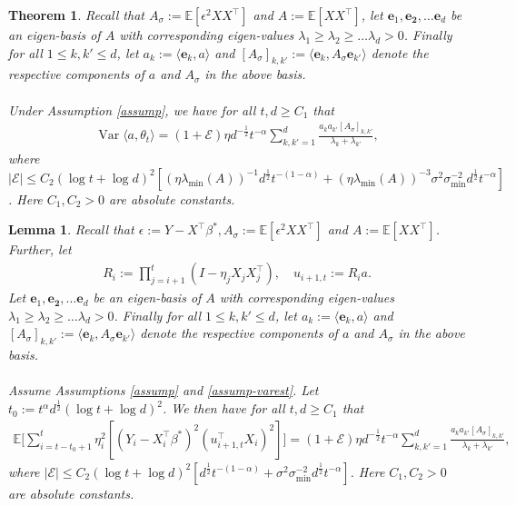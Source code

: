 \documentclass[11pt, reqno,english]{amsart}
\DeclareMathOperator{\Var}{Var} \DeclareMathOperator{\N}{N}
\newtheorem{theorem}{Theorem}[section]
\newtheorem{lemma}{Lemma}[section]
\begin{document}
\begin{theorem}\label{lem:VarAsymp}
Recall that $A_{\sigma} := \mathbb{E}[\epsilon^2 XX^\top]$ and $A := \mathbb{E}[XX^\top]$, let $\mathbf{e}_1, \mathbf{e_2}, \dots \mathbf{e}_d$ be an eigen-basis of $A$ with corresponding eigen-values $\lambda_1 \geq \lambda_2 \geq \dots \lambda_d > 0$. Finally for all $1 \leq k, k' \leq d$, let $a_k := \langle \mathbf{e}_k, a \rangle$ and $[A_{\sigma}]_{k,k'} := \langle  \mathbf{e}_k, A_\sigma \mathbf{e}_{k'}\rangle$ denote the respective components of $a$ and $A_{\sigma}$ in the above basis.
\\\\
Under Assumption \ref{assump}, we have for all $t, d \geq C_1$ that
\begin{align*}
\Var \langle a, \theta_t \rangle = (1 + \mathcal E)\eta d^{-\frac{1}{2}}t^{-\alpha} \sum_{k,k'=1}^d \frac{a_{k}a_{k'}[A_{\sigma}]_{k,k'}}{\lambda_k + \lambda_{k'}},
\end{align*}
where $|\mathcal E| \leq C_2(\log t + \log d)^2 [(\eta \lambda_{\min}(A))^{-1}d^{\frac{1}{2}}t^{-(1-\alpha)} + (\eta \lambda_{\min}(A))^{-3}\sigma^2\sigma_{\min}^{-2}d^{\frac{1}{2}}t^{-\alpha}]$. Here $C_1, C_2 > 0$ are absolute constants.
\end{theorem}
\begin{lemma}\label{variance-sigma-term-2}
Recall that $\epsilon := Y - X^\top \beta^*, A_{\sigma} := \mathbb{E}[\epsilon^2 XX^\top]$ and $A := \mathbb{E}[XX^\top]$. 
Further, let
\begin{align*}
R_i:= \prod_{j = i+1}^{t}(I - \eta_{j}X_{j}X^\top_{j}),  \quad u_{i+1,t} := R_ia.
\end{align*}
Let $\mathbf{e}_1, \mathbf{e_2}, \dots \mathbf{e}_d$ be an eigen-basis of $A$ with corresponding eigen-values $\lambda_1 \geq \lambda_2 \geq \dots \lambda_d > 0$. Finally for all $1 \leq k, k' \leq d$, let $a_k := \langle \mathbf{e}_k, a \rangle$ and $[A_{\sigma}]_{k,k'} := \langle  \mathbf{e}_k, A_\sigma \mathbf{e}_{k'}\rangle$ denote the respective components of $a$ and $A_{\sigma}$ in the above basis.
\\\\
Assume Assumptions \ref{assump} and \ref{assump-varest}. Let $t_0:= t^{\alpha}d^{\frac{1}{2}}(\log t + \log d)^2$. We then have for all $t,d \geq C_1$ that
\begin{align*}
\mathbb{E}\bigg[\sum_{i = t-t_0 + 1}^t \eta_i^2 [(Y_i - X^\top_i \beta^*)^2(u^\top_{i+1,t} X_i)^2] \bigg] = (1+\mathcal E)\eta d^{-\frac{1}{2}}t^{-\alpha}\sum_{k,k' = 1}^d \frac{a_k a_{k'}[A_{\sigma}]_{k,k'}}{\lambda_{k} + \lambda_{k'}},
\end{align*}
where $|\mathcal E| \leq C_2(\log t + \log d)^2 [d^{\frac{1}{2}}t^{-(1-\alpha)} + \sigma^2\sigma^{-2}_{\min}d^{\frac{1}{2}}t^{-\alpha}]$. Here $C_1, C_2 > 0$ are absolute constants. 
\end{lemma}
\end{document}
